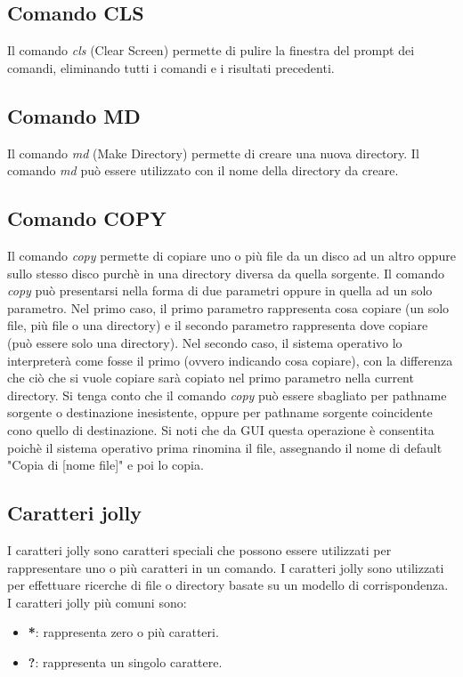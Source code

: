 \documentclass[12pt]{report}
\begin{document}
	\subsection{Comando CLS}
	Il comando \textit{cls} (Clear Screen) permette di pulire la finestra del prompt dei comandi, eliminando tutti i comandi e i risultati precedenti.

	\subsection{Comando MD}
	Il comando \textit{md} (Make Directory) permette di creare una nuova directory. Il comando \textit{md} può essere utilizzato con il nome della directory da creare.

	\subsection{Comando COPY}
	Il comando \textit{copy} permette di copiare uno o più file da un disco ad un altro oppure sullo stesso disco purchè in una directory diversa da quella sorgente. Il comando \textit{copy} può presentarsi nella forma di due parametri oppure in quella ad un solo parametro. Nel primo caso, il primo parametro rappresenta cosa copiare (un solo file, più file o una directory) e il secondo parametro rappresenta dove copiare (può essere solo una directory). Nel secondo caso, il sistema operativo lo interpreterà come fosse il primo (ovvero indicando cosa copiare), con la differenza che ciò che si vuole copiare sarà copiato nel primo parametro nella current directory. Si tenga conto che il comando \textit{copy} può essere sbagliato per pathname sorgente o destinazione inesistente, oppure per pathname sorgente coincidente cono quello di destinazione. Si noti che da GUI questa operazione è consentita poichè il sistema operativo prima rinomina il file, assegnando il nome di default "Copia di [nome file]" e poi lo copia.

	\subsection{Caratteri jolly}
	I caratteri jolly sono caratteri speciali che possono essere utilizzati per rappresentare uno o più caratteri in un comando. I caratteri jolly sono utilizzati per effettuare ricerche di file o directory basate su un modello di corrispondenza. I caratteri jolly più comuni sono:
	\begin{itemize}
		\item \textbf{*}: rappresenta zero o più caratteri.
		\item \textbf{?}: rappresenta un singolo carattere.
	\end{itemize}
\end{document}
